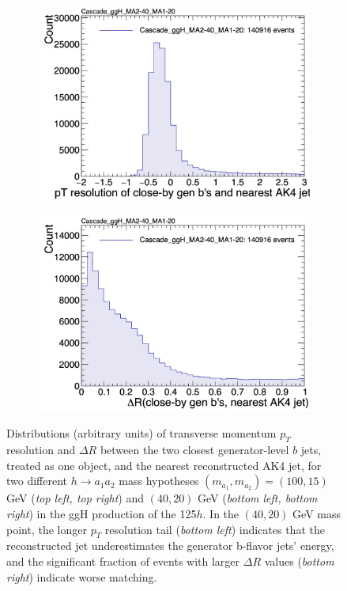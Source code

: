 \begin{figure}[ht]
\begin{subfigure}{0.45\textwidth}
        \includegraphics[width=1.0\textwidth]{figures/ch-11-asymmetric/Cascade_ggH_MA2-40_MA1-20_pt_resolution_ak4_leadingPair}
    \end{subfigure}
    \hfill
    \begin{subfigure}{0.45\textwidth}
        \includegraphics[width=1.0\textwidth]{figures/ch-11-asymmetric/Cascade_ggH_MA2-40_MA1-20_deltaR_ak4_leadingPair}
    \end{subfigure}     
    \caption{Distributions (arbitrary units) of transverse momentum $p_{T}$ resolution and $\Delta R$ between the two closest generator-level $b$ jets, treated as one object, and the nearest reconstructed AK4 jet, for two different $h\rightarrow a_1 a_2$ mass hypotheses $(m_{a_1}, m_{a_2}) = (100, 15)$ GeV (\textit{top left, top right}) and $(40, 20)$ GeV (\textit{bottom left, bottom right}) in the ggH production of the 125\GeV $h$. In the $(40, 20)$ GeV mass point, the longer $p_{T}$ resolution tail (\textit{bottom left}) indicates that the reconstructed jet underestimates the generator b-flavor jets' energy, and the significant fraction of events with larger $\Delta R$ values (\textit{bottom right}) indicate worse matching.}
    \label{fig:cascade_matching_to_AK4_jets}
\end{figure}




